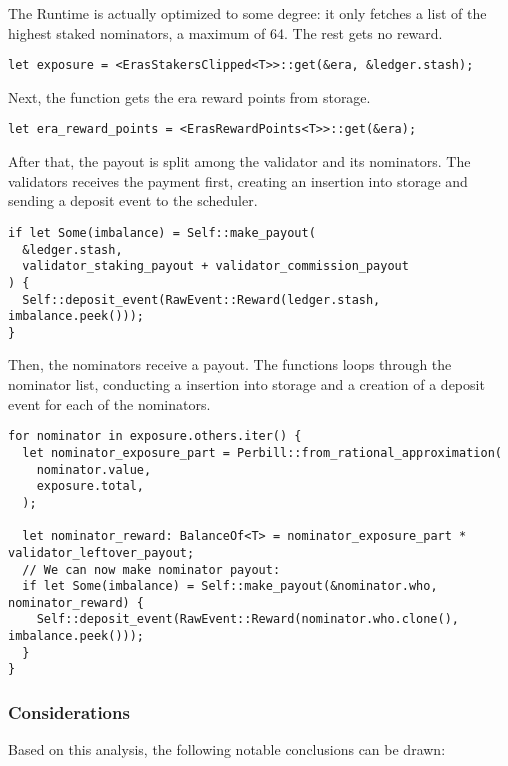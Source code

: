 \documentclass[11pt,a4paper]{article}
\begin{document}
The Runtime is actually optimized to some degree: it only fetches a list of the highest staked nominators,
a maximum of 64. The rest gets no reward.

\begin{verbatim}
let exposure = <ErasStakersClipped<T>>::get(&era, &ledger.stash);
\end{verbatim}

Next, the function gets the era reward points from storage.

\begin{verbatim}
let era_reward_points = <ErasRewardPoints<T>>::get(&era);
\end{verbatim}

After that, the payout is split among the validator and its nominators. The validators receives the payment
first, creating an insertion into storage and sending a deposit event to the scheduler.

\begin{verbatim}
if let Some(imbalance) = Self::make_payout(
  &ledger.stash,
  validator_staking_payout + validator_commission_payout
) {
  Self::deposit_event(RawEvent::Reward(ledger.stash, imbalance.peek()));
}
\end{verbatim}
\newpage

Then, the nominators receive a payout. The functions loops through the nominator list, conducting
a insertion into storage and a creation of a deposit event for each of the nominators.

\begin{verbatim}
for nominator in exposure.others.iter() {
  let nominator_exposure_part = Perbill::from_rational_approximation(
    nominator.value,
    exposure.total,
  );

  let nominator_reward: BalanceOf<T> = nominator_exposure_part * validator_leftover_payout;
  // We can now make nominator payout:
  if let Some(imbalance) = Self::make_payout(&nominator.who, nominator_reward) {
    Self::deposit_event(RawEvent::Reward(nominator.who.clone(), imbalance.peek()));
  }
}
\end{verbatim}

\subsubsection*{Considerations}

Based on this analysis, the following notable conclusions can be drawn:
\end{document}
